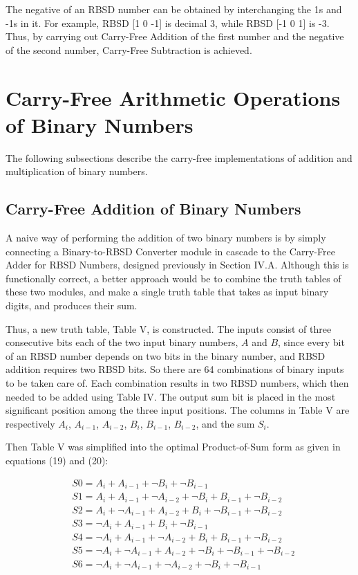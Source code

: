 \documentclass[conference]{IEEEtran}
\begin{document}
The negative of an RBSD number can be obtained by interchanging the 1s and -1s in it. For example, RBSD [1 0 -1] is decimal 3, while RBSD [-1 0 1] is -3. Thus, by carrying out Carry-Free Addition of the first number and the negative of the second number, Carry-Free Subtraction is achieved.

\section{Carry-Free Arithmetic Operations of Binary Numbers}

The following subsections describe the carry-free implementations of addition and multiplication of binary numbers.

\subsection{Carry-Free Addition of Binary Numbers}

A naive way of performing the addition of two binary numbers is by simply connecting a Binary-to-RBSD Converter module in cascade to the Carry-Free Adder for RBSD Numbers, designed previously in Section IV.A. Although this is functionally correct, a better approach would be to combine the truth tables of these two modules, and make a single truth table that takes as input binary digits, and produces their sum.

Thus, a new truth table, Table V, is constructed. The inputs consist of three consecutive bits each of the two input binary numbers, $A$ and $B$, since every bit of an RBSD number depends on two bits in the binary number, and RBSD addition requires two RBSD bits. So there are 64 combinations of binary inputs to be taken care of. Each combination results in two RBSD numbers, which then needed to be added using Table IV. The output sum bit is placed in the most significant position among the three input positions. The columns in Table V are respectively $A_{i}$, $A_{i-1}$, $A_{i-2}$, $B_{i}$, $B_{i-1}$, $B_{i-2}$, and the sum $S_{i}$.

Then Table V was simplified into the optimal Product-of-Sum form as given in equations (19) and (20):

\vspace{-1em}
\begin{align}
&S0 = A_{i} + A_{i-1} + \neg  B_{i} + \neg B_{i-1}\\
&S1 = A_{i} + A_{i-1} + \neg A_{i-2} + \neg B_{i} + B_{i-1} + \neg B_{i-2}\\
&S2 = A_{i} + \neg A_{i-1} + A_{i-2} + B_{i} + \neg B_{i-1} + \neg B_{i-2}\\
&S3 = \neg A_{i} + A_{i-1}   + B_{i} + \neg B_{i-1}\\
&S4 = \neg A_{i} + A_{i-1} + \neg A_{i-2} + B_{i} + B_{i-1} + \neg B_{i-2}\\
&S5 = \neg A_{i} + \neg A_{i-1} + A_{i-2} + \neg B_{i} + \neg B_{i-1} + \neg B_{i-2}\\
&S6 = \neg A_{i} + \neg A_{i-1} + \neg A_{i-2} + \neg B_{i} + \neg B_{i-1}
\end{align}
\end{document}
